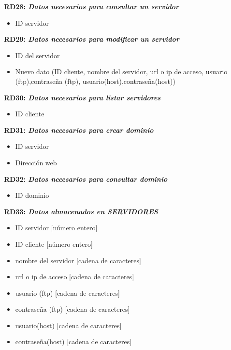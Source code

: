 \documentclass[paper=a4, fontsize=11pt, spanish]{scrartcl}
\begin{document}
\setlength{\parindent}{0em}
\textbf{RD28: \textit{Datos necesarios para consultar un servidor}}
\setlength{\parindent}{2em}
\begin{itemize}
  \item ID servidor
\end{itemize}

\setlength{\parindent}{0em}
\textbf{RD29: \textit{Datos necesarios para modificar un servidor}}
\setlength{\parindent}{2em}
\begin{itemize}
  \item ID del servidor
  \item Nuevo dato (ID cliente, nombre del servidor, url o ip de acceso, usuario (ftp),contraseña (ftp), usuario(host),contraseña(host))
\end{itemize}

\setlength{\parindent}{0em}
\textbf{RD30: \textit{Datos necesarios para listar servidores}}
\setlength{\parindent}{2em}
\begin{itemize}
  \item ID cliente
\end{itemize}

\setlength{\parindent}{0em}
\textbf{RD31: \textit{Datos necesarios para crear dominio}}
\setlength{\parindent}{2em}
\begin{itemize}
  \item ID servidor 
  \item Dirección web
\end{itemize}

\setlength{\parindent}{0em}
\textbf{RD32: \textit{Datos necesarios para consultar dominio}}
\setlength{\parindent}{2em}
\begin{itemize}
  \item ID dominio
\end{itemize}

\setlength{\parindent}{0em}
\textbf{RD33: \textit{Datos almacenados en SERVIDORES}}
\setlength{\parindent}{2em}
\begin{itemize}
  \item ID servidor [número entero]
  \item ID cliente [número entero]
  \item nombre del servidor [cadena de caracteres]
  \item url o ip de acceso [cadena de caracteres]
  \item usuario (ftp) [cadena de caracteres]
  \item contraseña (ftp) [cadena de caracteres]
  \item usuario(host) [cadena de caracteres]
  \item contraseña(host) [cadena de caracteres]
\end{itemize}
\end{document}

